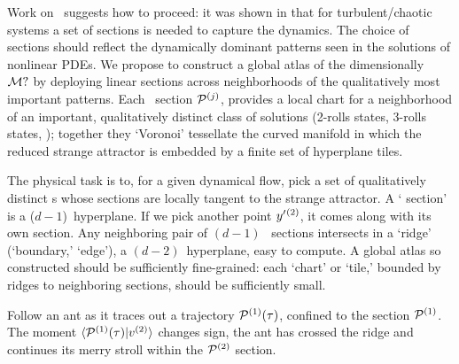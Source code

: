 Work on \KS\ suggests how to proceed: it was shown in  that for turbulent/chaotic systems a set of {\Poincare} sections is needed to capture the dynamics. The choice of sections should reflect the dynamically dominant patterns seen in the solutions of nonlinear PDEs. We propose to construct a global atlas of the dimensionally \reducedsp\ ${\cal M}?$ by deploying linear {\Poincare} sections across neighborhoods of the qualitatively most important patterns. 
Each \Poincare\ section ${\cal P}{}^{(j)}$, provides a local chart for a neighborhood of an important, qualitatively distinct class of solutions (2-rolls states, 3-rolls states, \etc); together they `Voronoi' tessellate  the curved manifold in which the reduced strange attractor is embedded by a finite set of hyperplane tiles.

The physical task is to, for a given dynamical flow, pick a set of
qualitatively distinct {\template s} whose {\Poincare} sections are locally tangent to
the strange attractor. A `{\Poincare} section' is a
($d\!-\!1$)\dmn\ hyperplane. If we pick another {\template} point
${y'}{}^{(2)}$, it comes along with its own {\Poincare} section. Any
neighboring pair of $(d\!-\!1)$\dmn\ {\Poincare} sections intersects in a `ridge'
(`boundary,' `edge'), a $(d\!-\!2)$\dmn\ hyperplane, easy to compute.
A global atlas so constructed should be sufficiently
fine-grained: each `chart' or `tile,' bounded by ridges to
neighboring {\Poincare} sections, should be sufficiently small.

Follow an ant as it traces out a trajectory
${\cal P}{}^{(1)}(\tau)$, confined to the {\Poincare} section ${\cal P}{}^{(1)}$. The
moment $\braket{\PoincS{}^{(1)}(\tau)}{\vel{}{}^{(2)}}$ changes
sign, the ant has crossed the ridge and  continues its merry stroll within the
${\cal P}{}^{(2)}$ {\Poincare} section.

